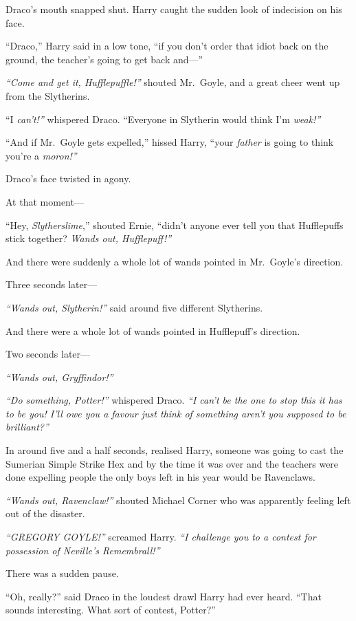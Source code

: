 Draco's mouth snapped shut. Harry caught the sudden look of indecision
on his face.

``Draco,'' Harry said in a low tone, ``if you don't order that idiot
back on the ground, the teacher's going to get back and---''

\emph{``Come and get it, Hufflepuffle!''} shouted Mr.~Goyle, and a great
cheer went up from the Slytherins.

``I \emph{can't!''} whispered Draco. ``Everyone in Slytherin would think
I'm \emph{weak!''}

``And if Mr.~Goyle gets expelled,'' hissed Harry, ``your \emph{father}
is going to think you're a \emph{moron!''}

Draco's face twisted in agony.

At that moment---

``Hey, \emph{Slytherslime},'' shouted Ernie, ``didn't anyone ever tell
you that Hufflepuffs stick together? \emph{Wands out, Hufflepuff!''}

And there were suddenly a whole lot of wands pointed in Mr.~Goyle's
direction.

Three seconds later---

\emph{``Wands out, Slytherin!''} said around five different Slytherins.

And there were a whole lot of wands pointed in Hufflepuff's direction.

Two seconds later---

\emph{``Wands out, Gryffindor!''}

\emph{``Do something, Potter!''} whispered Draco. \emph{``I can't be the
one to stop this it has to be you! I'll owe you a favour just think of
something aren't you supposed to be brilliant?''}

In around five and a half seconds, realised Harry, someone was going to
cast the Sumerian Simple Strike Hex and by the time it was over and the
teachers were done expelling people the only boys left in his year would
be Ravenclaws.

\emph{``Wands out, Ravenclaw!''} shouted Michael Corner who was
apparently feeling left out of the disaster.

\emph{``GREGORY GOYLE!''} screamed Harry. \emph{``I challenge you to a
contest for possession of Neville's Remembrall!''}

There was a sudden pause.

``Oh, really?'' said Draco in the loudest drawl Harry had ever heard.
``That sounds interesting. What sort of contest, Potter?''

